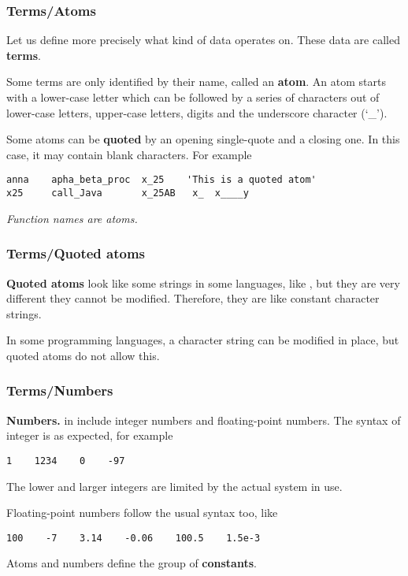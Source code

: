 
%
\begin{frame}[containsverbatim]
\frametitle{Terms/Atoms}

Let us define more precisely what kind of data \Erlang operates
on. These data are called \textbf{terms}.

\bigskip

Some terms are only identified by their name, called an
\textbf{atom}. An atom starts with a lower-case letter which can be
followed by a series of characters out of lower-case letters,
upper-case letters, digits and the underscore character (`\_').

\bigskip

Some atoms can be \textbf{quoted} by an opening single-quote and a
closing one.  In this case, it may contain blank characters. For
example
\begin{verbatim}
anna    apha_beta_proc  x_25    'This is a quoted atom'
x25     call_Java       x_25AB   x_  x____y
\end{verbatim}
\emph{Function names are atoms.}

\end{frame}

%
\begin{frame}
\frametitle{Terms/Quoted atoms}

\textbf{Quoted atoms} look like some strings in some languages, like
\Bash, but they are very different they cannot be modified. Therefore,
they are like constant character strings.

\bigskip

In some programming languages, a character string can be modified in
place, but quoted atoms do not allow this.

\end{frame}

%
\begin{frame}[containsverbatim]
\frametitle{Terms/Numbers}

\textbf{Numbers.} in \Erlang include integer numbers and floating-point
numbers. The syntax of integer is as expected, for example
\begin{verbatim}
1    1234    0    -97
\end{verbatim}
The lower and larger integers are limited by the actual \Prolog system
in use.

\bigskip

Floating-point numbers follow the usual syntax too, like
\begin{verbatim}
100    -7    3.14    -0.06    100.5    1.5e-3
\end{verbatim}
Atoms and numbers define the group of \textbf{constants}.

\end{frame}

